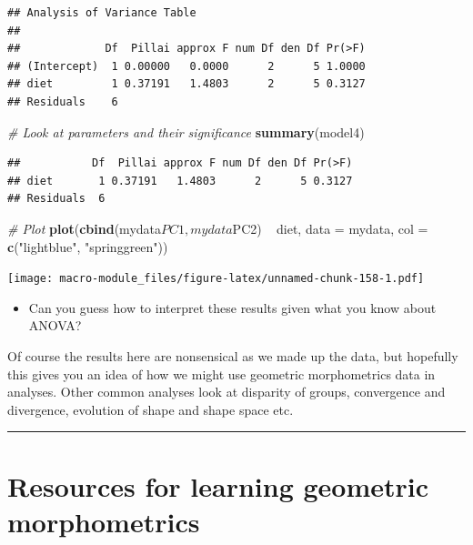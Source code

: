 \documentclass[]{book}
\newenvironment{Shaded}{\begin{snugshade}}{\end{snugshade}}
\newcommand{\KeywordTok}[1]{\textcolor[rgb]{0.13,0.29,0.53}{\textbf{{#1}}}}
\newcommand{\DataTypeTok}[1]{\textcolor[rgb]{0.13,0.29,0.53}{{#1}}}
\newcommand{\StringTok}[1]{\textcolor[rgb]{0.31,0.60,0.02}{{#1}}}
\newcommand{\CommentTok}[1]{\textcolor[rgb]{0.56,0.35,0.01}{\textit{{#1}}}}
\newcommand{\NormalTok}[1]{{#1}}
\providecommand{\tightlist}{%
  \setlength{\itemsep}{0pt}\setlength{\parskip}{0pt}}
\begin{document}
\begin{verbatim}
## Analysis of Variance Table
## 
##             Df  Pillai approx F num Df den Df Pr(>F)
## (Intercept)  1 0.00000   0.0000      2      5 1.0000
## diet         1 0.37191   1.4803      2      5 0.3127
## Residuals    6
\end{verbatim}

\begin{Shaded}
\begin{Highlighting}[]
\CommentTok{# Look at parameters and their significance}
\KeywordTok{summary}\NormalTok{(model4)}
\end{Highlighting}
\end{Shaded}

\begin{verbatim}
##           Df  Pillai approx F num Df den Df Pr(>F)
## diet       1 0.37191   1.4803      2      5 0.3127
## Residuals  6
\end{verbatim}

\begin{Shaded}
\begin{Highlighting}[]
\CommentTok{# Plot }
\KeywordTok{plot}\NormalTok{(}\KeywordTok{cbind}\NormalTok{(mydata$PC1,mydata$PC2) ~}\StringTok{ }\NormalTok{diet, }\DataTypeTok{data =} \NormalTok{mydata, }\DataTypeTok{col =} \KeywordTok{c}\NormalTok{(}\StringTok{"lightblue"}\NormalTok{, }\StringTok{"springgreen"}\NormalTok{))}
\end{Highlighting}
\end{Shaded}

\texttt{[image: macro-module\_files/figure-latex/unnamed-chunk-158-1.pdf]}

\begin{itemize}
\tightlist
\item
  Can you guess how to interpret these results given what you know about
  ANOVA?
\end{itemize}

Of course the results here are nonsensical as we made up the data, but
hopefully this gives you an idea of how we might use geometric
morphometrics data in analyses. Other common analyses look at disparity
of groups, convergence and divergence, evolution of shape and shape
space etc.

\begin{center}\rule{0.5\linewidth}{\linethickness}\end{center}

\section{Resources for learning geometric
morphometrics}\label{resources-for-learning-geometric-morphometrics}
\end{document}
